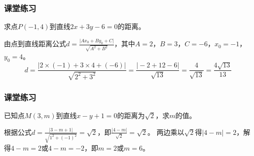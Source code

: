 \begin{frame}
  \frametitle{课堂练习}
    \begin{block}{}
      求点\(P(-1,4)\)到直线\(2x + 3y-6 = 0\)的距离。
    \end{block}
     
      \pause 
      \begin{solution}
          由点到直线距离公式\(d=\frac{\vert Ax_0 + By_0 + C\vert}{\sqrt{A^{2}+B^{2}}}\)，其中\(A=2\)，\(B=3\)，\(C=-6\)，\(x_0=-1\)，\(y_0=4\)。
          \[
          d=\frac{\vert2\times(-1)+3\times4+(-6)\vert}{\sqrt{2^{2}+3^{2}}}=\frac{\vert-2 + 12-6\vert}{\sqrt{13}}=\frac{4}{\sqrt{13}}=\frac{4\sqrt{13}}{13}
          \]
      \end{solution}
\end{frame}
\begin{frame}
  \frametitle{课堂练习}
    \begin{block}{}
      已知点\(M(3,m)\)到直线\(x - y+1 = 0\)的距离为\(\sqrt{2}\)，求\(m\)的值。
    \end{block}
     \pause

      \begin{solution}
          根据公式\(d=\frac{\vert3 - m+1\vert}{\sqrt{1^{2}+(-1)^{2}}}=\sqrt{2}\)，即\(\frac{\vert4 - m\vert}{\sqrt{2}}=\sqrt{2}\)。
          两边乘以\(\sqrt{2}\)得\(\vert4 - m\vert=2\)，解得\(4 - m=2\)或\(4 - m=-2\)，即\(m=2\)或\(m=6\)。
      \end{solution}

\end{frame}











